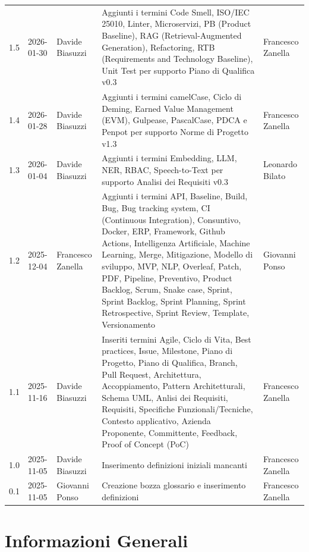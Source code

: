 \documentclass[a4paper, 11pt, oneside]{scrartcl} %
\begin{document}
{\begin{longtable}{@{}llp{}p{}p{}@{}}
        1.5 & 2026-01-30 & Davide Biasuzzi & Aggiunti i termini Code Smell, ISO/IEC 25010, Linter, Microservizi, PB (Product Baseline), RAG (Retrieval-Augmented Generation), Refactoring, RTB (Requirements and Technology Baseline), Unit Test per supporto Piano di Qualifica v0.3 & Francesco Zanella \\
        1.4 & 2026-01-28 & Davide Biasuzzi & Aggiunti i termini camelCase, Ciclo di Deming, Earned Value Management (EVM), Gulpease, PascalCase, PDCA e Penpot per supporto Norme di Progetto v1.3 & Francesco Zanella \\
        1.3 & 2026-01-04 & Davide Biasuzzi & Aggiunti i termini Embedding, LLM, NER, RBAC, Speech-to-Text per supporto Analisi dei Requisiti v0.3 & Leonardo Bilato \\
        1.2 & 2025-12-04 & Francesco Zanella & Aggiunti i termini API, Baseline, Build, Bug, Bug tracking system, CI (Continuous Integration), Consuntivo, Docker, ERP, Framework, Github Actions, Intelligenza Artificiale, Machine Learning, Merge, Mitigazione, Modello di sviluppo, MVP, NLP, Overleaf, Patch, PDF, Pipeline, Preventivo, Product Backlog, Scrum, Snake case, Sprint, Sprint Backlog, Sprint Planning, Sprint Retrospective, Sprint Review, Template, Versionamento & Giovanni Ponso \\
        1.1 & 2025-11-16 & Davide Biasuzzi & Inseriti termini Agile, Ciclo di Vita, Best practices, Issue, Milestone, Piano di Progetto, Piano di Qualifica, Branch, Pull Request, Architettura, Accoppiamento, Pattern Architetturali, Schema UML, Anlisi dei Requisiti, Requisiti, Specifiche Funzionali/Tecniche, Contesto applicativo, Azienda Proponente, Committente, Feedback, Proof of Concept (PoC) & Francesco Zanella \\
        1.0 & 2025-11-05 & Davide Biasuzzi & Inserimento definizioni iniziali mancanti & Francesco Zanella \\
        0.1 & 2025-11-05 & Giovanni Ponso & Creazione bozza glossario e inserimento definizioni & Francesco Zanella \\
\end{longtable}
}

\newpage
\tableofcontents %
\pagestyle{fancy}

\newpage
\section{Informazioni Generali}
\end{document}
